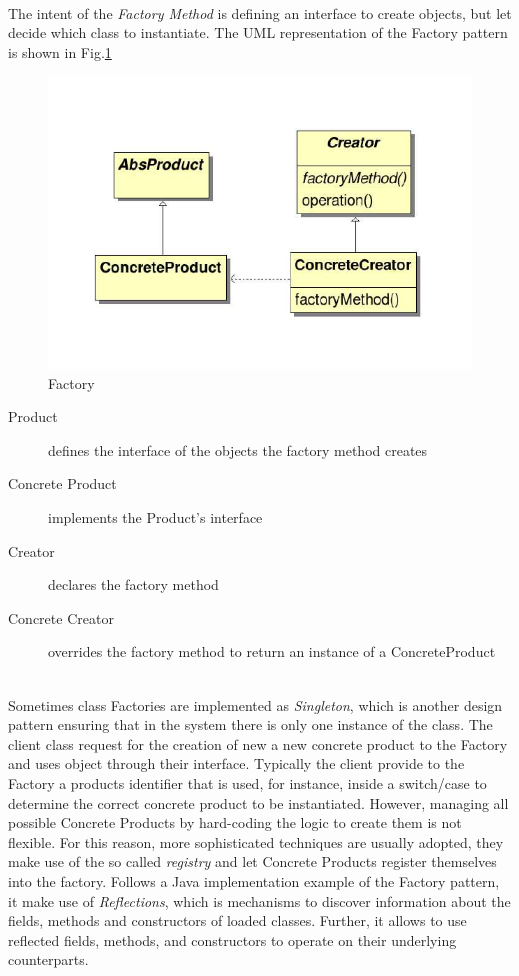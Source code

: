 \paragraph{} The intent of the \textit{Factory Method} is defining an interface to create objects, but let  decide which class to instantiate. The UML representation of the Factory pattern is shown in Fig.\ref{fig:factory}

\begin{figure}[h]
\centering
\includegraphics[width=.7\textwidth]{Figs/factory2.png}
\caption{Factory}
\label{fig:factory}
\end{figure}

\begin{description}
\item[Product] defines the interface of the objects the factory method creates
\item[Concrete Product] implements the Product's interface
\item[Creator]declares the factory method
\item[Concrete Creator] overrides the factory method to return an instance of a
ConcreteProduct
\end{description}
\noindent
\\
Sometimes class Factories are implemented as \textit{Singleton}, which is another design pattern ensuring that in the system there is only one instance of the class. The client class request for the creation of new a new concrete product to the Factory and uses object through their interface. Typically the client provide to the Factory a products identifier that is used, for instance, inside a switch/case to determine the correct concrete product to be instantiated. However, managing all possible Concrete Products by hard-coding the logic to create them is not flexible. For this reason, more sophisticated techniques are usually adopted, they make use of the so called \textit{registry} and let Concrete Products register themselves into the factory. Follows a Java implementation example of the Factory pattern, it make use of \textit{Reflections}, which is mechanisms to discover information about the fields, methods and constructors of loaded classes. Further, it allows to use reflected fields, methods, and constructors to operate on their underlying counterparts.

